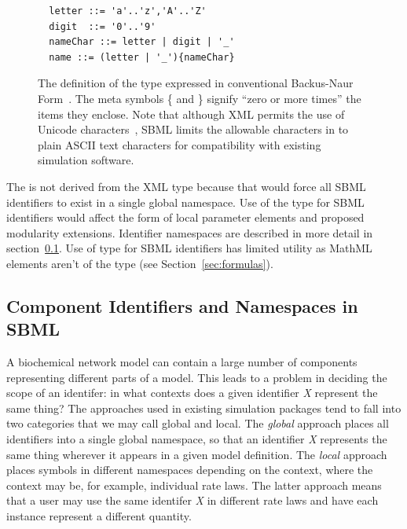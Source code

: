 \documentclass[10pt]{cekarticle}
\begin{document}
\begin{figure}[th]
  \vspace*{10pt}
  \centering
  \begin{minipage}{3.8in}
\begin{verbatim}
  letter ::= 'a'..'z','A'..'Z'
  digit  ::= '0'..'9'
  nameChar ::= letter | digit | '_'
  name ::= (letter | '_'){nameChar}
\end{verbatim}
  \end{minipage}
  \caption{The definition of the type  expressed in conventional
    Backus-Naur Form~\protect\citep{naur:1960}.  The meta symbols \{ and \} signify
    ``zero or more times'' the items they enclose.  Note that although XML
    permits the use of Unicode characters~\protect\citep{unicode:1996}, SBML
    limits the allowable characters in  to plain ASCII text
    characters for compatibility with existing simulation software.}
  \label{fig:id}
\end{figure}

The  is not derived from the XML  type
because that would force all SBML identifiers to exist in a single
global namespace.  Use of the  type for SBML identifiers
would affect the form of local parameter elements and proposed
modularity extensions.  Identifier namespaces are described in
more detail in section~\ref{sec:namespaces}.  Use of 
type for SBML identifiers has limited utility as MathML 
elements aren't of the type  (see
Section~\ref{sec:formulas}).


\subsection{Component Identifiers and Namespaces in SBML}
\label{sec:namespaces}

A biochemical network model can contain a large number of
components representing different parts of a model.  This leads to
a problem in deciding the scope of an identifer: in what contexts
does a given identifier \emph{X} represent the same thing?  The
approaches used in existing simulation packages tend to fall into
two categories that we may call global and local.  The
\emph{global} approach places all identifiers into a single global
namespace, so that an identifier \emph{X} represents the same thing
wherever it appears in a given model definition.  The \emph{local}
approach places symbols in different namespaces depending on the
context, where the context may be, for example, individual rate
laws.  The latter approach means that a user may use the same
identifer \emph{X} in different rate laws and have each instance
represent a different quantity.
\end{document}
